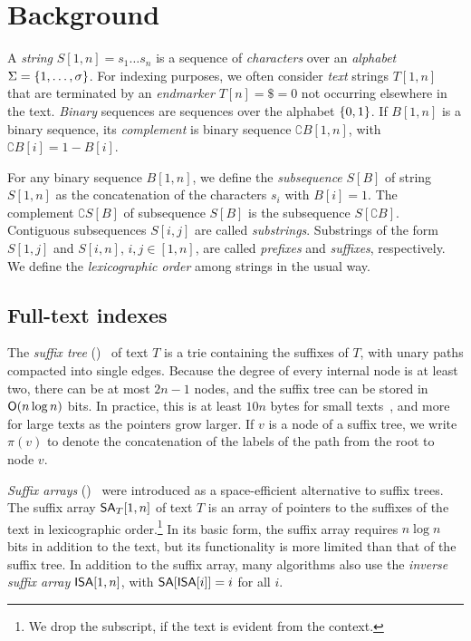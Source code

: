 
\section{Background}

A \emph{string} $S[1,n] = s_{1} \dotso s_{n}$ is a sequence of
\emph{characters} over an \emph{alphabet} $\Sigma = \{ 1, \dotsc, \sigma \}$.
For indexing purposes, we often consider \emph{text} strings $T[1,n]$ that are
terminated by an \emph{endmarker} $T[n] = \$ = 0$ not occurring elsewhere in
the text. \emph{Binary} sequences are sequences over the alphabet $\{ 0,1 \}$.
If $B[1,n]$ is a binary sequence, its \emph{complement} is binary sequence
$\complement{B}[1,n]$, with $\complement{B}[i] = 1 - B[i]$.

For any binary sequence $B[1,n]$, we define the \emph{subsequence} $S[B]$ of
string $S[1,n]$ as the concatenation of the characters $s_{i}$ with $B[i] = 1$.
The complement $\complement{S}[B]$ of subsequence $S[B]$ is the subsequence
$S[\complement{B}]$. Contiguous subsequences $S[i,j]$ are called
\emph{substrings}. Substrings of the form $S[1,j]$ and $S[i,n]$, $i,j \in
[1,n]$, are called \emph{prefixes} and \emph{suffixes}, respectively. We
define the \emph{lexicographic order} among strings in the usual way.

\subsection{Full-text indexes}

The \emph{suffix tree} (\ST)~\cite{Weiner1973} of text $T$ is a trie
containing the suffixes of $T$, with unary paths compacted into single edges.
Because the degree of every internal node is at least two, there can be at most
$2n-1$ nodes, and the suffix tree can be stored in $\mathsf{O}(n \log n)$ bits. In
practice, this is at least $10n$ bytes for small texts~\cite{Kurtz1999}, and
more for large texts as the pointers grow larger. If $v$ is a node of a suffix
tree, we write $\pi(v)$ to denote the concatenation of the labels of the path
from the root to node $v$.

\emph{Suffix arrays} (\SA)~\cite{Manber1993} were introduced as a
space-efficient alternative to suffix trees. The suffix array $\mathsf{SA}_{T}[1,n]$ of
text $T$ is an array of pointers to the suffixes of the text in lexicographic
order.\footnote{We drop the subscript, if the text is evident from the context.}
In its basic form, the suffix array requires $n \log n$ bits in
addition to the text, but its functionality is more limited than that of the
suffix tree. In addition to the suffix array, many algorithms also use the
\emph{inverse suffix array} $\mathsf{ISA}[1,n]$, with $\mathsf{SA}[\mathsf{ISA}[i]] = i$ for all
$i$.

